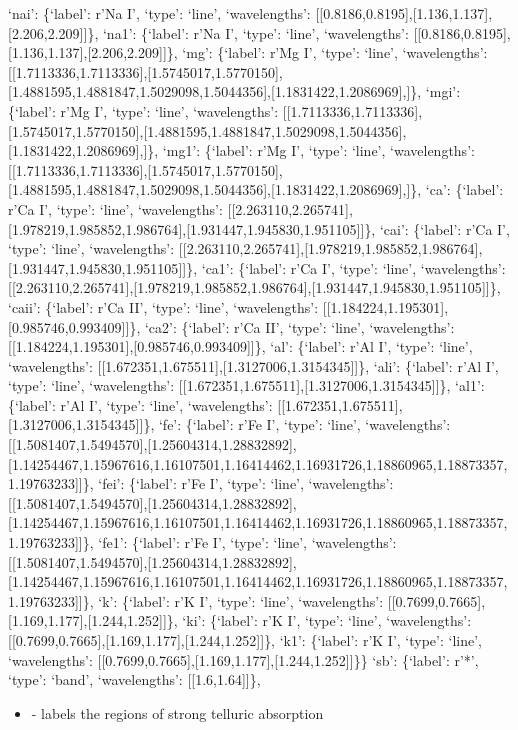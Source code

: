 \documentclass[letterpaper,10pt,english]{sphinxmanual}
\begin{document}
\begin{description}
`nai': \{`label': r'Na I', `type': `line', `wavelengths': {[}{[}0.8186,0.8195{]},{[}1.136,1.137{]},{[}2.206,2.209{]}{]}\}, `na1': \{`label': r'Na I', `type': `line', `wavelengths': {[}{[}0.8186,0.8195{]},{[}1.136,1.137{]},{[}2.206,2.209{]}{]}\}, `mg': \{`label': r'Mg I', `type': `line', `wavelengths': {[}{[}1.7113336,1.7113336{]},{[}1.5745017,1.5770150{]},{[}1.4881595,1.4881847,1.5029098,1.5044356{]},{[}1.1831422,1.2086969{]},{]}\}, `mgi': \{`label': r'Mg I', `type': `line', `wavelengths': {[}{[}1.7113336,1.7113336{]},{[}1.5745017,1.5770150{]},{[}1.4881595,1.4881847,1.5029098,1.5044356{]},{[}1.1831422,1.2086969{]},{]}\}, `mg1': \{`label': r'Mg I', `type': `line', `wavelengths': {[}{[}1.7113336,1.7113336{]},{[}1.5745017,1.5770150{]},{[}1.4881595,1.4881847,1.5029098,1.5044356{]},{[}1.1831422,1.2086969{]},{]}\}, `ca': \{`label': r'Ca I', `type': `line', `wavelengths': {[}{[}2.263110,2.265741{]},{[}1.978219,1.985852,1.986764{]},{[}1.931447,1.945830,1.951105{]}{]}\}, `cai': \{`label': r'Ca I', `type': `line', `wavelengths': {[}{[}2.263110,2.265741{]},{[}1.978219,1.985852,1.986764{]},{[}1.931447,1.945830,1.951105{]}{]}\}, `ca1': \{`label': r'Ca I', `type': `line', `wavelengths': {[}{[}2.263110,2.265741{]},{[}1.978219,1.985852,1.986764{]},{[}1.931447,1.945830,1.951105{]}{]}\}, `caii': \{`label': r'Ca II', `type': `line', `wavelengths': {[}{[}1.184224,1.195301{]},{[}0.985746,0.993409{]}{]}\}, `ca2': \{`label': r'Ca II', `type': `line', `wavelengths': {[}{[}1.184224,1.195301{]},{[}0.985746,0.993409{]}{]}\}, `al': \{`label': r'Al I', `type': `line', `wavelengths': {[}{[}1.672351,1.675511{]},{[}1.3127006,1.3154345{]}{]}\}, `ali': \{`label': r'Al I', `type': `line', `wavelengths': {[}{[}1.672351,1.675511{]},{[}1.3127006,1.3154345{]}{]}\}, `al1': \{`label': r'Al I', `type': `line', `wavelengths': {[}{[}1.672351,1.675511{]},{[}1.3127006,1.3154345{]}{]}\}, `fe': \{`label': r'Fe I', `type': `line', `wavelengths': {[}{[}1.5081407,1.5494570{]},{[}1.25604314,1.28832892{]},{[}1.14254467,1.15967616,1.16107501,1.16414462,1.16931726,1.18860965,1.18873357,1.19763233{]}{]}\}, `fei': \{`label': r'Fe I', `type': `line', `wavelengths': {[}{[}1.5081407,1.5494570{]},{[}1.25604314,1.28832892{]},{[}1.14254467,1.15967616,1.16107501,1.16414462,1.16931726,1.18860965,1.18873357,1.19763233{]}{]}\}, `fe1': \{`label': r'Fe I', `type': `line', `wavelengths': {[}{[}1.5081407,1.5494570{]},{[}1.25604314,1.28832892{]},{[}1.14254467,1.15967616,1.16107501,1.16414462,1.16931726,1.18860965,1.18873357,1.19763233{]}{]}\}, `k': \{`label': r'K I', `type': `line', `wavelengths': {[}{[}0.7699,0.7665{]},{[}1.169,1.177{]},{[}1.244,1.252{]}{]}\}, `ki': \{`label': r'K I', `type': `line', `wavelengths': {[}{[}0.7699,0.7665{]},{[}1.169,1.177{]},{[}1.244,1.252{]}{]}\}, `k1': \{`label': r'K I', `type': `line', `wavelengths': {[}{[}0.7699,0.7665{]},{[}1.169,1.177{]},{[}1.244,1.252{]}{]}\}\}
`sb': \{`label': r'*', `type': `band', `wavelengths': {[}{[}1.6,1.64{]}{]}\}, 

\end{description}
\begin{itemize}
\item {} 
 - labels the regions of strong telluric absorption

\end{itemize}
\end{document}
